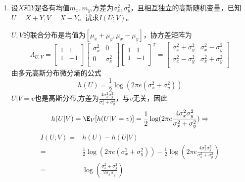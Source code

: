 \documentclass[a4paper]{article}
\begin{document}
\courseheader
{}


\begin{enumerate}[label=\thehwcnt.\arabic*.]
  \setlength{\itemsep}{3\parskip}

  \item 设$X$和$Y$是各有均值$m_x,m_y$,方差为$\sigma_x^2,\sigma_y^2$，且相互独立的高斯随机变量，已知$U=X+Y,V=X-Y$。试求$I(U;V)$。
\begin{solution}
$U,V$的联合分布是均值为$[\mu_x+\mu_y,\mu_x-\mu_y]$，协方差矩阵为
$$\Lambda_{U,V}=\begin{bmatrix}
1 & 1\\
1 & -1\\
\end{bmatrix}
\begin{bmatrix}
\sigma_x^2 & 0\\
0 & \sigma_x^2\\
\end{bmatrix}
\begin{bmatrix}
1 & 1\\
1 & -1\\
\end{bmatrix}^T
=\begin{bmatrix}
\sigma_x^2+\sigma_y^2 & \sigma_x^2-\sigma_y^2\\
\sigma_x^2-\sigma_y^2 & \sigma_x^2+\sigma_y^2\\
\end{bmatrix}
$$
由多元高斯分布微分熵的公式
$$
h(U)=\frac{1}{2}\log (2\pi e (\sigma_x^2 + \sigma_y^2))
$$
$U|V=v$也是高斯分布,方差为$\frac{4\sigma_x^2\sigma_y^2}{\sigma_x^2+\sigma_y^2}$，与$v$无关，因此
$$
h(U|V)=\E_{V}[h(U|V=v)]=\frac{1}{2}\log(2\pi e \frac{4\sigma_x^2\sigma_y^2}{\sigma_x^2+\sigma_y^2})\Rightarrow
$$
\begin{align*}
I(U;V)=& h(U)-h(U|V)\\
=&\frac{1}{2}\log(2\pi  e (\sigma^2_x + \sigma^
2_y))-\frac{1}{2}\log(2\pi e \frac{4\sigma_x^2\sigma_y^2}{\sigma_x^2+\sigma_y^2})\\
=& \log \left( \frac{\sigma_x^2+\sigma_y^2}{2\sigma_x\sigma_y} \right)
\end{align*}



\end{solution}
\end{enumerate}
\end{document}
